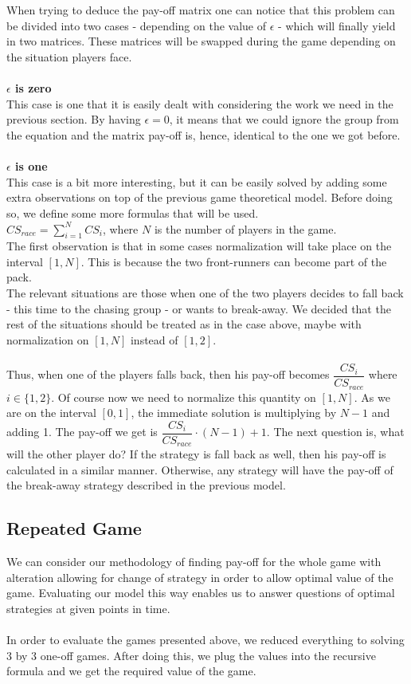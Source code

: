 \documentclass[10pt, a4paper]{report}
\begin{document}
\\\\
When trying to deduce the pay-off matrix one can notice that this problem can be divided into two cases - depending on the value of $\epsilon$ - which will finally yield in two matrices. These matrices will be swapped during the game depending on the situation players face.
\\\\
\textbf{$\epsilon$ is zero}
\\
This case is one that it is easily dealt with considering the work we need in the previous section. By having $\epsilon = 0$, it means that we could ignore the group from the equation and the matrix pay-off is, hence, identical to the one we got before.
\\\\
\textbf{$\epsilon$ is one}
\\
This case is a bit more interesting, but it can be easily solved by adding some extra observations on top of the previous game theoretical model. Before doing so, we define some more formulas that will be used.\\
$CS_{race} = \sum\limits_{i=1}^{N} CS_i$, where $N$ is the number of players in the game. \\
The first observation is that in some cases normalization will take place on the interval $[1,N]$. This is because the two front-runners can become part of the pack.\\
The relevant situations are those when one of the two players decides to fall back - this time to the chasing group - or wants to break-away. We decided that the rest of the situations should be treated as in the case above, maybe with normalization on $[1,N]$ instead of $[1,2]$.\\\\
Thus, when one of the players falls back, then his pay-off becomes $\dfrac{CS_i}{CS_{race}}$ where $i\in\{1,2\}$. Of course now we need to normalize this quantity on $[1,N]$. As we are on the interval $[0,1]$, the immediate solution is multiplying by $N-1$ and adding 1. The pay-off we get is $ \dfrac{CS_i}{CS_{race}}\cdot (N-1) + 1$. The next question is, what will the other player do? If the strategy is fall back as well, then his pay-off is calculated in a similar manner. Otherwise, any strategy will have the pay-off of the break-away strategy described in the previous model.

\subsection{Repeated Game}\label{subsec:repgame}
We can consider our methodology of finding pay-off for the whole game with alteration allowing for change of strategy in order to allow optimal value of the game. Evaluating our model this way enables us to answer questions of optimal strategies at given points in time.\\\\
In order to evaluate the games presented above, we reduced everything to solving 3 by 3 one-off games. After doing this, we plug the values into the recursive formula and we get the required value of the game.
\end{document}
